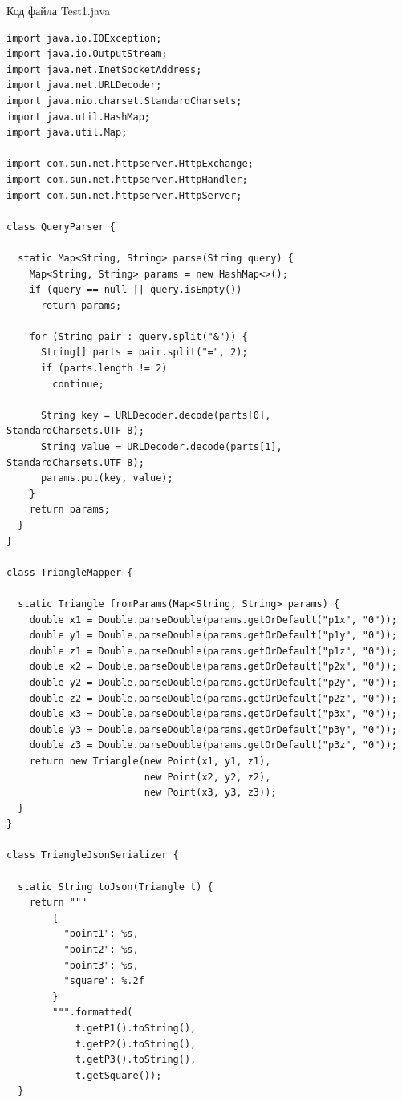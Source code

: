 \documentclass[a4paper, 14pt]{extarticle}
\begin{document}
\par
Код файла Test1.java
\begin{lstlisting}
import java.io.IOException;
import java.io.OutputStream;
import java.net.InetSocketAddress;
import java.net.URLDecoder;
import java.nio.charset.StandardCharsets;
import java.util.HashMap;
import java.util.Map;

import com.sun.net.httpserver.HttpExchange;
import com.sun.net.httpserver.HttpHandler;
import com.sun.net.httpserver.HttpServer;

class QueryParser {

  static Map<String, String> parse(String query) {
    Map<String, String> params = new HashMap<>();
    if (query == null || query.isEmpty())
      return params;

    for (String pair : query.split("&")) {
      String[] parts = pair.split("=", 2);
      if (parts.length != 2)
        continue;

      String key = URLDecoder.decode(parts[0], StandardCharsets.UTF_8);
      String value = URLDecoder.decode(parts[1], StandardCharsets.UTF_8);
      params.put(key, value);
    }
    return params;
  }
}

class TriangleMapper {

  static Triangle fromParams(Map<String, String> params) {
    double x1 = Double.parseDouble(params.getOrDefault("p1x", "0"));
    double y1 = Double.parseDouble(params.getOrDefault("p1y", "0"));
    double z1 = Double.parseDouble(params.getOrDefault("p1z", "0"));
    double x2 = Double.parseDouble(params.getOrDefault("p2x", "0"));
    double y2 = Double.parseDouble(params.getOrDefault("p2y", "0"));
    double z2 = Double.parseDouble(params.getOrDefault("p2z", "0"));
    double x3 = Double.parseDouble(params.getOrDefault("p3x", "0"));
    double y3 = Double.parseDouble(params.getOrDefault("p3y", "0"));
    double z3 = Double.parseDouble(params.getOrDefault("p3z", "0"));
    return new Triangle(new Point(x1, y1, z1),
                        new Point(x2, y2, z2),
                        new Point(x3, y3, z3));
  }
}

class TriangleJsonSerializer {

  static String toJson(Triangle t) {
    return """
        {
          "point1": %s,
          "point2": %s,
          "point3": %s,
          "square": %.2f
        }
        """.formatted(
            t.getP1().toString(),
            t.getP2().toString(),
            t.getP3().toString(),
            t.getSquare());
  }


\end{lstlisting}
\end{document}
